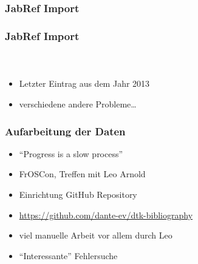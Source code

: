 \documentclass[ngerman]{beamer}
\begin{document}
\begin{frame}
\frametitle{JabRef Import}

\begin{center}
\end{center}
\end{frame}


\begin{frame}
\frametitle{JabRef Import}
\framesubtitle{~}

\begin{itemize}
	\item Letzter Eintrag aus dem Jahr 2013
	\item verschiedene andere Probleme\ldots
\end{itemize}

\begin{center}
\end{center}

\end{frame}

\begin{frame}
\frametitle{Aufarbeitung der Daten}

\begin{itemize}
\item \enquote{Progress is a slow process}
\item FrOSCon, Treffen mit Leo Arnold
\item Einrichtung GitHub Repository
\item \url{https://github.com/dante-ev/dtk-bibliography}
\item viel manuelle Arbeit vor allem durch Leo
\item \enquote{Interessante} Fehlersuche
\end{itemize}
\end{frame}
\end{document}
